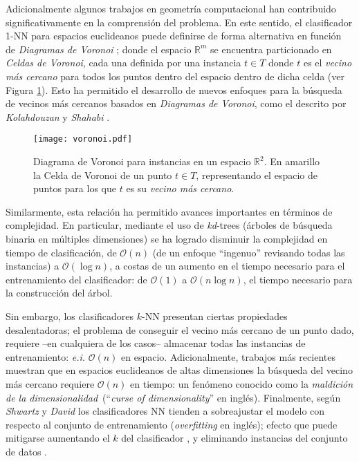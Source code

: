Adicionalmente algunos trabajos en geometría computacional han contribuido significativamente en la comprensión del problema. En este sentido, el clasificador 1-NN para espacios euclideanos puede definirse de forma alternativa en función de \emph{Diagramas de Voronoi} \cite{voronoi1908nouvelles}; donde el espacio $\mathbb{R}^m$ se encuentra particionado en \emph{Celdas de Voronoi}, cada una definida por una instancia $t \in T$ donde $t$ es el \emph{vecino más cercano} para todos los puntos dentro del espacio dentro de dicha celda (ver Figura \ref{voronoi}). Esto ha permitido el desarrollo de nuevos enfoques para la búsqueda de vecinos más cercanos basados en \emph{Diagramas de Voronoi}, como el descrito por \emph{Kolahdouzan} y \emph{Shahabi} \cite{Kolahdouzan:2004:VKN:1316689.1316762}.

\begin{figure}[h!]
\centering
\texttt{[image: voronoi.pdf]}
\caption[Diagramas de Voronoi y NN]{Diagrama de Voronoi para instancias en un espacio $\mathbb{R}^2$. En amarillo la Celda de Voronoi de un punto $t \in T$, representando el espacio de puntos para los que $t$ es su \emph{vecino más cercano}.}
\label{voronoi}
\end{figure}

Similarmente, esta relación ha permitido avances importantes en términos de complejidad. En particular, mediante el uso de \emph{kd}-trees \cite{Bentley:1975:MBS:361002.361007} (árboles de búsqueda binaria en múltiples dimensiones) se ha logrado disminuir la complejidad en tiempo de clasificación, de $\mathcal{O}(n)$ (de un enfoque ``ingenuo'' revisando todas las instancias) a $\mathcal{O}(\log{n})$, a costas de un aumento en el tiempo necesario para el entrenamiento del clasificador: de $\mathcal{O}(1)$ a $\mathcal{O}(n\log{n})$, el tiempo necesario para la construcción del árbol.

Sin embargo, los clasificadores $k$-NN presentan ciertas propiedades desalentadoras; el problema de conseguir el vecino más cercano de un punto dado, requiere --en cualquiera de los casos-- almacenar todas las instancias de entrenamiento: \emph{e.i.} $\mathcal{O}(n)$ en espacio. Adicionalmente, trabajos más recientes \cite{DBLP:conf/soda/KrauthgamerL04} muestran que en espacios euclideanos de altas dimensiones la búsqueda del vecino más cercano requiere $\mathcal{O}(n)$ en tiempo: un fenómeno conocido como la \guillemotleft\emph{maldición de la dimensionalidad}\guillemotright\ (``\emph{curse of dimensionality}'' en inglés). Finalmente, según \emph{Shwartz} y \emph{David} \cite{shalev2014understanding} los clasificadores NN tienden a sobreajustar el modelo con respecto al conjunto de entrenamiento (\emph{overfitting} en inglés); efecto que puede mitigarse aumentando el $k$ del clasificador \cite{devroye1994strong, shalev2014understanding}, y eliminando instancias del conjunto de datos \cite{DBLP:journals/corr/GottliebKK13}.

